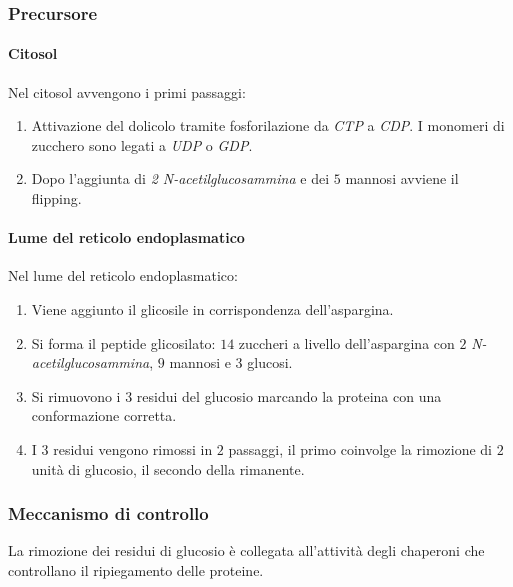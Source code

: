 		\subsubsection{Precursore}
		
			\paragraph{Citosol}
			Nel citosol avvengono i primi passaggi:
			\begin{multicols}{2}
				\begin{enumerate}
					\item Attivazione del dolicolo tramite fosforilazione da \emph{CTP} a \emph{CDP}.
						I monomeri di zucchero sono legati a \emph{UDP} o \emph{GDP}.
					\item Dopo l'aggiunta di \emph{2 N-acetilglucosammina} e dei $5$ mannosi avviene il flipping.
				\end{enumerate}
			\end{multicols}

			\paragraph{Lume del reticolo endoplasmatico}
			Nel lume del reticolo endoplasmatico:
			\begin{multicols}{2}
				\begin{enumerate}
					\item Viene aggiunto il glicosile in corrispondenza dell'aspargina.
					\item Si forma il peptide glicosilato: $14$ zuccheri a livello dell'aspargina con $2$ \emph{N-acetilglucosammina}, $9$ mannosi e $3$ glucosi.
					\item Si rimuovono i $3$ residui del glucosio marcando la proteina con una conformazione corretta.
					\item I $3$ residui vengono rimossi in $2$ passaggi, il primo coinvolge la rimozione di $2$ unit\`a di glucosio, il secondo della rimanente.
				\end{enumerate}
			\end{multicols}

		\subsubsection{Meccanismo di controllo}
		La rimozione dei residui di glucosio \`e collegata all'attivit\`a degli chaperoni che controllano il ripiegamento delle proteine.

